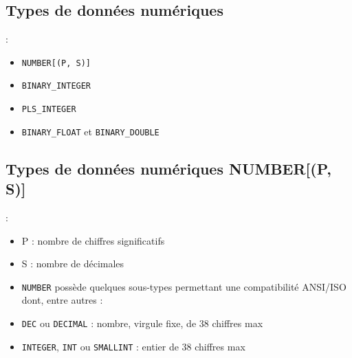 \documentclass[10pt]{beamer}
\begin{document}
\subsection{Types de données numériques}
\begin{frame}{\secname : \subsecname}
    \begin{itemize}
        \item \lstinline[language=plsql]!NUMBER[(P, S)]!
        \item \lstinline[language=plsql]!BINARY_INTEGER!
        \item \lstinline[language=plsql]!PLS_INTEGER!
        \item \lstinline[language=plsql]!BINARY_FLOAT! et \lstinline[language=plsql]!BINARY_DOUBLE!
    \end{itemize}

\end{frame}

\subsection{Types de données numériques NUMBER[(P, S)]}
\begin{frame}{\secname : \subsecname}
    \begin{itemize}
        \item P : nombre de chiffres significatifs
        \item S : nombre de décimales
        \item \lstinline[language=plsql]!NUMBER! possède quelques sous-types permettant une compatibilité ANSI/ISO dont, entre autres :
        \item \lstinline[language=plsql]!DEC! ou \lstinline[language=plsql]!DECIMAL! : nombre, virgule fixe, de 38 chiffres max
        \item \lstinline[language=plsql]!INTEGER!, \lstinline[language=plsql]!INT! ou \lstinline[language=plsql]!SMALLINT! : entier de 38 chiffres max
    \end{itemize}
\end{frame}
\end{document}
